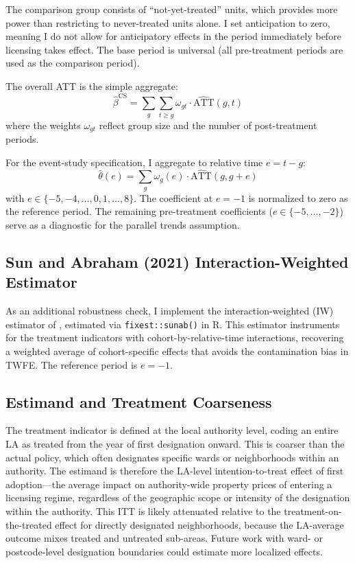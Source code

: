 \documentclass[12pt]{article}
\begin{document}
The comparison group consists of ``not-yet-treated'' units, which provides more power than restricting to never-treated units alone. I set anticipation to zero, meaning I do not allow for anticipatory effects in the period immediately before licensing takes effect. The base period is universal (all pre-treatment periods are used as the comparison period).

The overall ATT is the simple aggregate:
\begin{equation}
\hat{\beta}^{\text{CS}} = \sum_{g} \sum_{t \geq g} \omega_{gt} \cdot \widehat{\text{ATT}}(g, t)
\end{equation}
where the weights $\omega_{gt}$ reflect group size and the number of post-treatment periods.

For the event-study specification, I aggregate to relative time $e = t - g$:
\begin{equation}
\hat{\theta}(e) = \sum_{g} \omega_g(e) \cdot \widehat{\text{ATT}}(g, g + e)
\end{equation}
with $e \in \{-5, -4, \ldots, 0, 1, \ldots, 8\}$. The coefficient at $e = -1$ is normalized to zero as the reference period. The remaining pre-treatment coefficients ($e \in \{-5, \ldots, -2\}$) serve as a diagnostic for the parallel trends assumption.

\subsection{Sun and Abraham (2021) Interaction-Weighted Estimator}

As an additional robustness check, I implement the interaction-weighted (IW) estimator of \citet{sun2021estimating}, estimated via \texttt{fixest::sunab()} in R. This estimator instruments for the treatment indicators with cohort-by-relative-time interactions, recovering a weighted average of cohort-specific effects that avoids the contamination bias in TWFE. The reference period is $e = -1$.

\subsection{Estimand and Treatment Coarseness}

The treatment indicator is defined at the local authority level, coding an entire LA as treated from the year of first designation onward. This is coarser than the actual policy, which often designates specific wards or neighborhoods within an authority. The estimand is therefore the LA-level intention-to-treat effect of first adoption---the average impact on authority-wide property prices of entering a licensing regime, regardless of the geographic scope or intensity of the designation within the authority. This ITT is likely attenuated relative to the treatment-on-the-treated effect for directly designated neighborhoods, because the LA-average outcome mixes treated and untreated sub-areas. Future work with ward- or postcode-level designation boundaries could estimate more localized effects.
\end{document}
